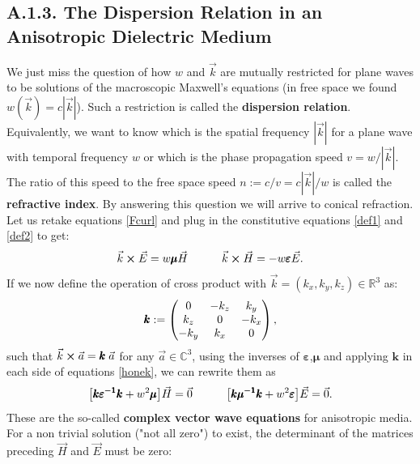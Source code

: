 \documentclass[11pt, a4paper, twoside]{article} %
\newcommand{\R}{\mathbb{R}} %
\newcommand{\C}{\mathbb{C}}
\begin{document}
\subsection*{A.1.3. The Dispersion Relation in an Anisotropic Dielectric Medium\vspace{-0.2cm}}
We just miss the question of how $w$ and $\vec{k}$ are mutually restricted for plane waves to be solutions of the macroscopic Maxwell's equations (in free space we found $w(\vec{k})=c|\vec{k}|$). Such a restriction is called the {\bf dispersion relation}. Equivalently, we want to know which is the spatial frequency $|\vec{k}|$ for a plane wave with temporal frequency $w$ or which is the phase propagation speed $v=w/|\vec{k}|$. The ratio of this speed to the free space speed $n:=c/v=c|\vec{k}|/w$ is called the {\bf refractive index}. By answering this question we will arrive to conical refraction. Let us retake equations \eqref{Fcurl} and plug in the constitutive equations \eqref{def1} and \eqref{def2} to get:
\begin{equation}\label{honek}
\vec{k}\cross \vec{E}=w\pmb{\mu}\vec{H} \quad \quad \quad \vec{k}\cross\vec{H}=-w\pmb{\varepsilon}\vec{E}.
\end{equation} 
If we now define the operation of cross product with $\vec{k}=(k_x,k_y,k_z)\in\R^3$ as:\vspace{-0.1cm}
\begin{equation}
\pmb{k}:=\begin{pmatrix}
0& -k_z& k_y\\
k_z & 0 & -k_x\\
-k_y & k_x & 0
\end{pmatrix},\vspace{-0.1cm}
\end{equation}
such that $\vec{k}\cross\vec{a}=\pmb{k}\;\vec{a}$ for any $\vec{a}\in\C^3$, using the inverses of $\pmb{\varepsilon}$,$\pmb{\mu}$ and applying $\pmb{k}$ in each side of equations \eqref{honek}, we can rewrite them as\vspace{-0.1cm}
\begin{equation}
\qty[\pmb{k}\pmb{\varepsilon^{-1}}\pmb{k}+w^2\pmb{\mu}]\vec{H}=\vec{0} \quad \quad \quad \qty[\pmb{k}\pmb{\mu^{-1}}\pmb{k}+w^2\pmb{\varepsilon}]\vec{E}=\vec{0}.
\end{equation}
These are the so-called {\bf complex vector wave equations} for anisotropic media. For a non trivial solution ("not all zero") to exist, the determinant of the matrices preceding $\vec{H}$ and $\vec{E}$ must be zero:
\end{document}
